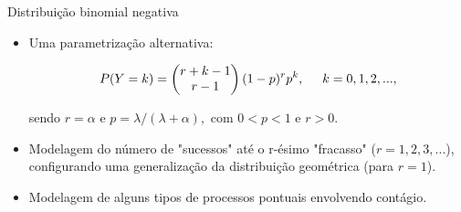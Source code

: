 \documentclass[10pt, aspectratio=169]{beamer}
\begin{document}


\begin{frame}{Distribuição binomial negativa} 

\begin{itemize}

\item Uma parametrização alternativa:

\vspace{0.5cm}

$$
P(Y=k) = \left ( \begin{matrix}
r+k-1\\ 
r-1
\end{matrix} \right ) (1-p)^rp^k, \hspace{0,5cm} k=0,1,2,...,
$$

\vspace{0.5cm}

sendo $r=\alpha$ e $p=\lambda/(\lambda+\alpha),$ com $0<p<1$ e $r>0$.  
\vspace{0.5cm}

\item Modelagem do número de "sucessos" até o r-ésimo "fracasso" ($r = 1,2,3,...$), configurando uma generalização da distribuição geométrica (para $r=1$).

\vspace{0.5cm}

\item Modelagem de alguns tipos de processos pontuais envolvendo contágio.

\end{itemize}

\end{frame}




\end{document}
